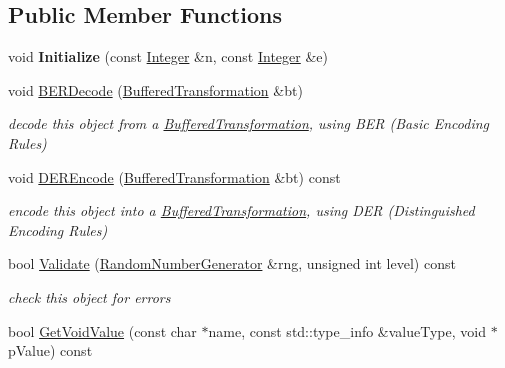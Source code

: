 \subsection*{Public Member Functions}
\begin{DoxyCompactItemize}
\item 
\hypertarget{class_e_s_i_g_n_function_a8517acbd8209e7eeb56138d0ab616265}{
void {\bfseries Initialize} (const \hyperlink{class_integer}{Integer} \&n, const \hyperlink{class_integer}{Integer} \&e)}
\label{class_e_s_i_g_n_function_a8517acbd8209e7eeb56138d0ab616265}

\item 
\hypertarget{class_e_s_i_g_n_function_a6517cb00d59eb584c9ecf86d3dce6742}{
void \hyperlink{class_e_s_i_g_n_function_a6517cb00d59eb584c9ecf86d3dce6742}{BERDecode} (\hyperlink{class_buffered_transformation}{BufferedTransformation} \&bt)}
\label{class_e_s_i_g_n_function_a6517cb00d59eb584c9ecf86d3dce6742}

\begin{DoxyCompactList}\small\item\em decode this object from a \hyperlink{class_buffered_transformation}{BufferedTransformation}, using BER (Basic Encoding Rules) \item\end{DoxyCompactList}\item 
\hypertarget{class_e_s_i_g_n_function_a524f9708759975ed9a9481ee94b9eb08}{
void \hyperlink{class_e_s_i_g_n_function_a524f9708759975ed9a9481ee94b9eb08}{DEREncode} (\hyperlink{class_buffered_transformation}{BufferedTransformation} \&bt) const }
\label{class_e_s_i_g_n_function_a524f9708759975ed9a9481ee94b9eb08}

\begin{DoxyCompactList}\small\item\em encode this object into a \hyperlink{class_buffered_transformation}{BufferedTransformation}, using DER (Distinguished Encoding Rules) \item\end{DoxyCompactList}\item 
bool \hyperlink{class_e_s_i_g_n_function_ad9696d3e060bd7acb702b5bfa650eeb7}{Validate} (\hyperlink{class_random_number_generator}{RandomNumberGenerator} \&rng, unsigned int level) const 
\begin{DoxyCompactList}\small\item\em check this object for errors \item\end{DoxyCompactList}\item 
\hypertarget{class_e_s_i_g_n_function_a53def4f94e81acd0e02a3e50fb9b15ee}{
bool \hyperlink{class_e_s_i_g_n_function_a53def4f94e81acd0e02a3e50fb9b15ee}{GetVoidValue} (const char $\ast$name, const std::type\_\-info \&valueType, void $\ast$pValue) const }
\label{class_e_s_i_g_n_function_a53def4f94e81acd0e02a3e50fb9b15ee}


\end{DoxyCompactItemize}
